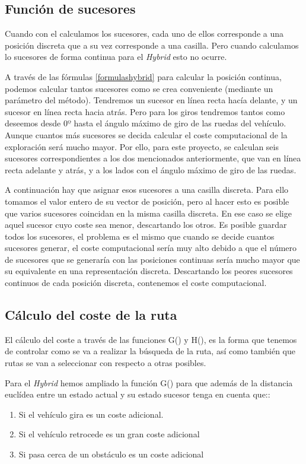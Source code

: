 \subsection{Función de sucesores}
Cuando con el \Astar calculamos los sucesores, cada uno de ellos corresponde a una posición discreta que a su vez corresponde a una casilla. Pero cuando calculamos lo sucesores de forma continua para el \textit{Hybrid \Astar} esto no ocurre.

A través de las fórmulas \ref{formulashybrid} para calcular la posición continua, podemos calcular tantos sucesores como se crea conveniente (mediante un parámetro del método). Tendremos un sucesor en línea recta hacía delante, y un sucesor en línea recta hacia atrás. Pero para los giros tendremos tantos como deseemos desde $0º$ hasta el ángulo máximo de giro de las ruedas del vehículo. Aunque cuantos más sucesores se decida calcular el coste computacional de la exploración será mucho mayor. Por ello, para este proyecto, se calculan seis sucesores correspondientes a los dos mencionados anteriormente, que van en línea recta adelante y atrás, y a los lados con el ángulo máximo de giro de las ruedas.

A continuación hay que asignar esos sucesores a una casilla discreta. Para ello tomamos el valor entero de su vector de posición, pero al hacer esto es posible que varios sucesores coincidan en la misma casilla discreta. En ese caso se elige aquel sucesor cuyo coste sea menor, descartando los otros. Es posible guardar todos los sucesores, el problema es el mismo que cuando se decide cuantos sucesores generar, el coste computacional sería muy alto debido a que el número de sucesores que se generaría con las posiciones continuas sería mucho mayor que su equivalente en una representación discreta. Descartando los peores sucesores continuos de cada posición discreta, contenemos el coste computacional.

\subsection{Cálculo del coste de la ruta} \label{hybridcoste}
El cálculo del coste a través de las funciones G() y H(), es la forma que tenemos de controlar como se va a realizar la búsqueda de la ruta, así como también que rutas se van a seleccionar con respecto a otras posibles.

Para el \textit{Hybrid \Astar} hemos ampliado la función G() para que además de la distancia euclídea entre un estado actual y su estado sucesor tenga en cuenta que::
\begin{enumerate}
\item Si el vehículo gira es un coste adicional.
\item Si el vehículo retrocede es un gran coste adicional
\item Si pasa cerca de un obstáculo es un coste adicional
\end{enumerate}


